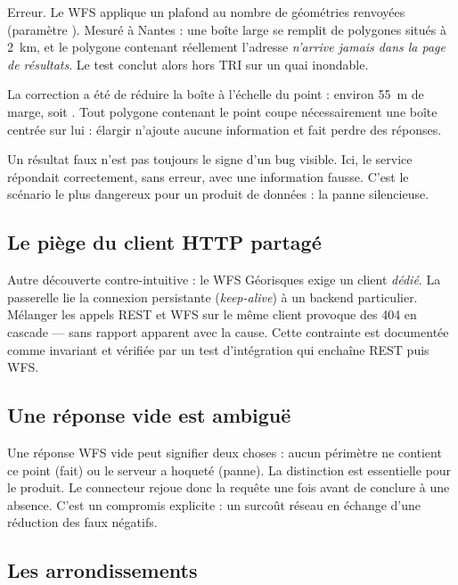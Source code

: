 Erreur. Le WFS applique un plafond au nombre de géométries renvoyées
(paramètre ). Mesuré à Nantes : une boîte large se remplit de
polygones situés à 2~km, et le polygone contenant réellement l'adresse
\emph{n'arrive jamais dans la page de résultats}. Le test conclut alors \og
hors TRI \fg{} sur un quai inondable.

La correction a été de réduire la boîte à l'échelle du point : environ 55~m de
marge, soit . Tout polygone
contenant le point coupe
nécessairement une boîte centrée sur lui : élargir n'ajoute aucune information
et fait perdre des réponses.

\begin{honesty}
Un résultat faux n'est pas toujours le signe d'un bug visible. Ici, le service
répondait correctement, sans erreur, avec une information fausse. C'est le
scénario le plus dangereux pour un produit de données : la panne silencieuse.
\end{honesty}

\subsection{Le piège du client HTTP partagé}

Autre découverte contre-intuitive : le WFS Géorisques exige un client
 \emph{dédié}. La passerelle lie la connexion
persistante (\emph{keep-alive}) à un backend particulier. Mélanger les appels
REST et WFS sur le même client provoque des 404 en cascade — sans rapport
apparent avec la cause. Cette contrainte est documentée comme invariant et
vérifiée par un test d'intégration qui enchaîne REST puis WFS.

\subsection{Une réponse vide est ambiguë}

Une réponse WFS vide peut signifier deux choses : \og aucun périmètre ne
contient ce point \fg{} (fait) ou \og le serveur a hoqueté \fg{} (panne). La
distinction est essentielle pour le produit. Le connecteur rejoue donc la
requête une fois avant de conclure à une absence. C'est un compromis explicite :
un surcoût réseau en échange d'une réduction des faux négatifs.

\subsection{Les arrondissements}

